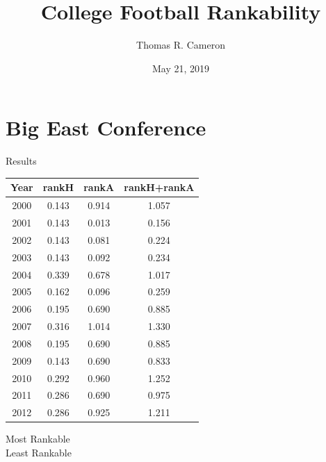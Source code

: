\documentclass{beamer}
\title{College Football Rankability}
\author{Thomas R. Cameron}
\institute{Davidson College}
\date{May 21, 2019}
\begin{document}
\begin{frame}
	\titlepage
\end{frame}


\section{Big East Conference}

\begin{frame}{Results}
\begin{minipage}{0.6\textwidth}
\centering
\begin{tabular}{|| c | c | c | c ||}
\hline
Year & rankH & rankA & rankH+rankA \\
\hline\hline
2000 & 0.143 & 0.914 & 1.057 \\
\hline
\rowcolor{secondary}
2001 & 0.143 & 0.013 & 0.156 \\
\hline
2002 & 0.143 & 0.081 & 0.224 \\
\hline
2003 & 0.143 & 0.092 & 0.234 \\
\hline
2004 & 0.339 & 0.678 & 1.017 \\
\hline
2005 & 0.162 & 0.096 & 0.259 \\
\hline
2006 & 0.195 & 0.690 & 0.885 \\
\hline
\rowcolor{text}
2007 & 0.316 & 1.014 & 1.330\\
\hline
2008 & 0.195 & 0.690 & 0.885 \\
\hline
2009 & 0.143 & 0.690 & 0.833 \\
\hline
2010 & 0.292 & 0.960 & 1.252 \\
\hline
2011 & 0.286 & 0.690 & 0.975 \\
\hline
2012 & 0.286 & 0.925 & 1.211 \\
\hline
\end{tabular}
\end{minipage}\hfill
\begin{minipage}{0.3\textwidth}
\vfill
{}\quad Most Rankable\\
\vfill
{}\quad Least Rankable\\
\vfill
\end{minipage}
\end{frame}
\end{document}
